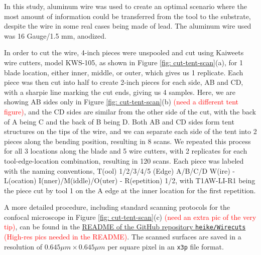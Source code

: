 \documentclass[fleqn,10pt]{wlscirep}
\begin{document}
In this study, aluminum wire was used to create an optimal scenario
where the most amount of information could be transferred from the tool
to the substrate, despite the wire in some real cases being made of
lead. The aluminum wire used was 16 Gauge/1.5 mm, anodized.

In order to cut the wire, 4-inch pieces were unspooled and cut using
Kaiweets wire cutters, model KWS-105, as shown in Figure
\ref{fig: cut-tent-scan}(a), for 1 blade location, either inner, middle,
or outer, which gives us 1 replicate. Each piece was then cut into half
to create 2-inch pieces for each side, AB and CD, with a sharpie line
marking the cut ends, giving us 4 samples. Here, we are showing AB sides
only in Figure \ref{fig: cut-tent-scan}(b)
\textcolor{red}{(need a different tent figure)}, and the CD sides are
similar from the other side of the cut, with the back of A being C and
the back of B being D. Both AB and CD sides form tent structures on the
tips of the wire, and we can separate each side of the tent into 2
pieces along the bending position, resulting in 8 scans. We repeated
this process for all 3 locations along the blade and 5 wire cutters,
with 2 replicates for each tool-edge-location combination, resulting in
120 scans. Each piece was labeled with the naming conventions, T(ool)
1/2/3/4/5 (Edge) A/B/C/D W(ire) - L(ocation) I(nner)/M(iddle)/O(uter) -
R(epetition) 1/2, with T1AW-LI-R1 being the piece cut by tool 1 on the A
edge at the inner location for the first repetition.

A more detailed procedure, including standard scanning protocols for the
confocal microscope in Figure \ref{fig: cut-tent-scan}(c)
\textcolor{red}{(need an extra pic of the very tip)}, can be found in
the
\href{https://github.com/heike/Wirecuts/blob/main/README.md}{README of the GitHub repository \texttt{heike/Wirecuts}}
\textcolor{red}{(High-res pics needed in the README)}. The scanned
surfaces are saved in a resolution of \(0.645 \mu m \times 0.645 \mu m\)
per square pixel in an \texttt{x3p} file format.
\end{document}
